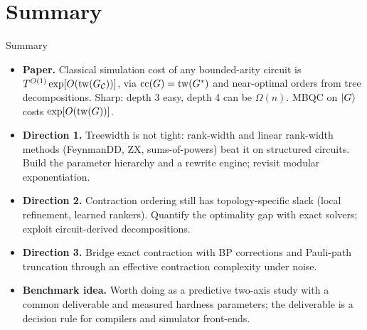 \section{Summary}

\begin{frame}{Summary}
    \begin{itemize}
        \item \textbf{Paper.} Classical simulation cost of any bounded-arity circuit is $T^{O(1)}\exp[O(\operatorname{tw}(G_{\mathcal{C}}))]$, via $\operatorname{cc}(G)=\operatorname{tw}(G^*)$ and near-optimal orders from tree decompositions. Sharp: depth 3 easy, depth 4 can be $\Omega(n)$. MBQC on $\ket{G}$ costs $\exp[O(\operatorname{tw}(G))]$.
        \item \textbf{Direction 1.} Treewidth is not tight: rank-width and linear rank-width methods (FeynmanDD, ZX, sums-of-powers) beat it on structured circuits. Build the parameter hierarchy and a rewrite engine; revisit modular exponentiation.
        \item \textbf{Direction 2.} Contraction ordering still has topology-specific slack (local refinement, learned rankers). Quantify the optimality gap with exact solvers; exploit circuit-derived decompositions.
        \item \textbf{Direction 3.} Bridge exact contraction with BP corrections and Pauli-path truncation through an effective contraction complexity under noise.
        \item \textbf{Benchmark idea.} Worth doing as a predictive two-axis study with a common deliverable and measured hardness parameters; the deliverable is a decision rule for compilers and simulator front-ends.
    \end{itemize}
\end{frame}
